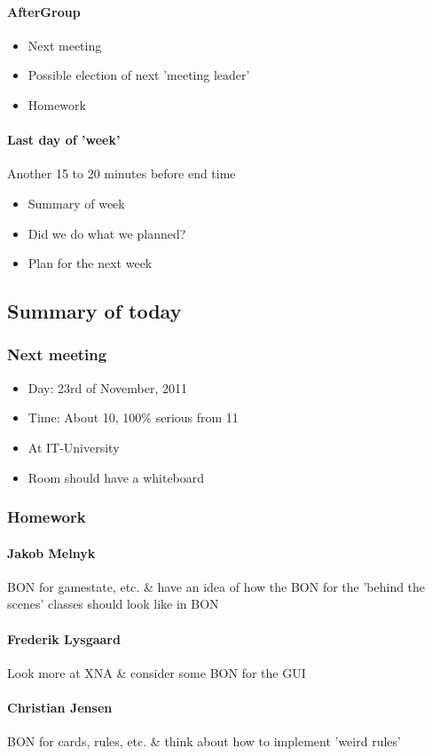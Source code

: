 \paragraph{AfterGroup}
\begin{itemize}
\item Next meeting
\item Possible election of next 'meeting leader'
\item Homework
\end{itemize}

\paragraph{Last day of 'week'} 
Another 15 to 20 minutes before end time
\begin{itemize}
\item Summary of week
\item Did we do what we planned?
\item Plan for the next week
\end{itemize}

\subsection{Summary of today}
\subsubsection{Next meeting}
\begin{itemize}
\item Day: 23rd of November, 2011
\item Time: About 10, 100\% serious from 11
\item At IT-University
\item Room should have a whiteboard
\end{itemize}

\subsubsection{Homework}
\paragraph{Jakob Melnyk}
BON for gamestate, etc. \& have an idea of how the BON for the 'behind the scenes' classes should look like in BON
\paragraph{Frederik Lysgaard}
Look more at XNA \& consider some BON for the GUI
\paragraph{Christian Jensen}
BON for cards, rules, etc. \& think about how to implement 'weird rules'